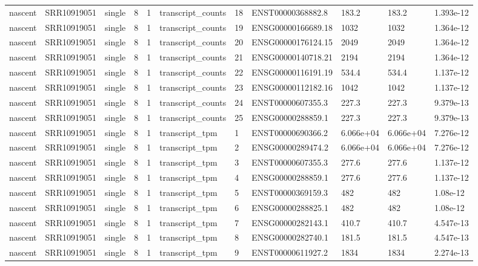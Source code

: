 \begin{tabular}{lllllllllll}
nascent & SRR10919051 & single & 8 & 1 & transcript\_counts & 18 & ENST00000368882.8 & 183.2 & 183.2 & 1.393e-12 \\
nascent & SRR10919051 & single & 8 & 1 & transcript\_counts & 19 & ENSG00000166689.18 & 1032 & 1032 & 1.364e-12 \\
nascent & SRR10919051 & single & 8 & 1 & transcript\_counts & 20 & ENSG00000176124.15 & 2049 & 2049 & 1.364e-12 \\
nascent & SRR10919051 & single & 8 & 1 & transcript\_counts & 21 & ENSG00000140718.21 & 2194 & 2194 & 1.364e-12 \\
nascent & SRR10919051 & single & 8 & 1 & transcript\_counts & 22 & ENSG00000116191.19 & 534.4 & 534.4 & 1.137e-12 \\
nascent & SRR10919051 & single & 8 & 1 & transcript\_counts & 23 & ENSG00000112182.16 & 1042 & 1042 & 1.137e-12 \\
nascent & SRR10919051 & single & 8 & 1 & transcript\_counts & 24 & ENST00000607355.3 & 227.3 & 227.3 & 9.379e-13 \\
nascent & SRR10919051 & single & 8 & 1 & transcript\_counts & 25 & ENSG00000288859.1 & 227.3 & 227.3 & 9.379e-13 \\
nascent & SRR10919051 & single & 8 & 1 & transcript\_tpm & 1 & ENST00000690366.2 & 6.066e+04 & 6.066e+04 & 7.276e-12 \\
nascent & SRR10919051 & single & 8 & 1 & transcript\_tpm & 2 & ENSG00000289474.2 & 6.066e+04 & 6.066e+04 & 7.276e-12 \\
nascent & SRR10919051 & single & 8 & 1 & transcript\_tpm & 3 & ENST00000607355.3 & 277.6 & 277.6 & 1.137e-12 \\
nascent & SRR10919051 & single & 8 & 1 & transcript\_tpm & 4 & ENSG00000288859.1 & 277.6 & 277.6 & 1.137e-12 \\
nascent & SRR10919051 & single & 8 & 1 & transcript\_tpm & 5 & ENST00000369159.3 & 482 & 482 & 1.08e-12 \\
nascent & SRR10919051 & single & 8 & 1 & transcript\_tpm & 6 & ENSG00000288825.1 & 482 & 482 & 1.08e-12 \\
nascent & SRR10919051 & single & 8 & 1 & transcript\_tpm & 7 & ENSG00000282143.1 & 410.7 & 410.7 & 4.547e-13 \\
nascent & SRR10919051 & single & 8 & 1 & transcript\_tpm & 8 & ENSG00000282740.1 & 181.5 & 181.5 & 4.547e-13 \\
nascent & SRR10919051 & single & 8 & 1 & transcript\_tpm & 9 & ENST00000611927.2 & 1834 & 1834 & 2.274e-13 \\

\end{tabular}

